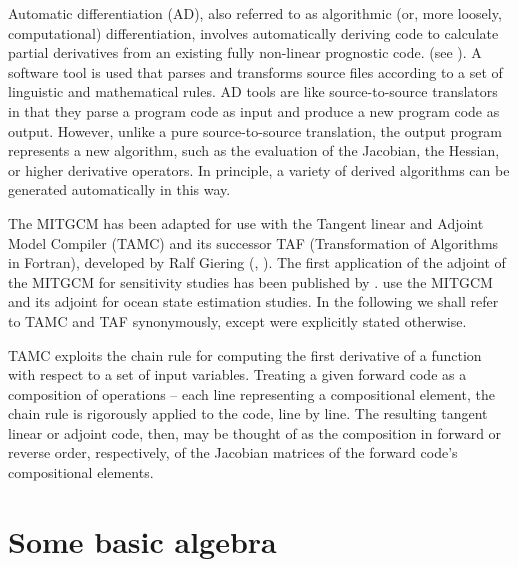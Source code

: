
{\sf Automatic differentiation} (AD), also referred to as algorithmic
(or, more loosely, computational) differentiation, involves 
automatically deriving code to calculate
partial derivatives from an existing fully non-linear prognostic code.
(see \cite{gri:00}).
A software tool is used that parses and transforms source files 
according to a set of linguistic and mathematical rules. 
AD tools are like source-to-source translators in that
they parse a program code as input and produce a new program code 
as output.
However, unlike a pure source-to-source translation, the output program
represents a new algorithm, such as the evaluation of the
Jacobian, the Hessian, or higher derivative operators.
In principle, a variety of derived algorithms
can be generated automatically in this way.

The MITGCM has been adapted for use with the
Tangent linear and Adjoint Model Compiler (TAMC) and its successor TAF
(Transformation of Algorithms in Fortran), developed
by Ralf Giering (\cite{gie-kam:98}, \cite{gie:99,gie:00}).
The first application of the adjoint of the MITGCM for sensitivity
studies has been published by \cite{maro-eta:99}.
\cite{sta-eta:97,sta-eta:01} use the MITGCM and its adjoint
for ocean state estimation studies.
In the following we shall refer to TAMC and TAF synonymously,
except were explicitly stated otherwise.

TAMC exploits the chain rule for computing the first
derivative of a function with
respect to a set of input variables. 
Treating a given forward code as a composition of operations --
each line representing a compositional element, the chain rule is
rigorously applied to the code, line by line. The resulting 
tangent linear or adjoint code,
then, may be thought of as the composition in 
forward or reverse order, respectively, of the
Jacobian matrices of the forward code's compositional elements.

\section{Some basic algebra}
\label{sec_ad_algebra}

